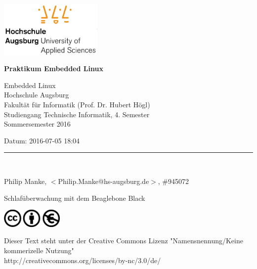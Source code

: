 \documentclass[a4paper,ngerman]{article}
\begin{document}
\ \ 
\hfill
\begin{minipage}[t]{5cm}
\includegraphics[width=5cm]{img/hsa-logo.jpg}
\end{minipage}

\vskip 10mm

{\parindent=0pt

\thispagestyle{empty}


{\Large\bf Praktikum Embedded Linux
}

\vskip 5mm

Embedded Linux \\
Hochschule Augsburg \\
Fakultät für Informatik (Prof. Dr. Hubert Högl) \\
Studiengang Technische Informatik, 4. Semester \\

Sommersemester 2016
 

Datum: 2016-07-05 18:04 \\

\medskip

\rule{10cm}{4pt}\\

\medskip

Philip Manke, $<$Philip.Manke@hs-augsburg.de$>$, \#945072 \\


\vskip 2cm

\begin{center}
{\LARGE\bf

Schlafüberwachung mit dem Beaglebone Black

}
\end{center}

\vfill

\begin{minipage}[t]{3cm}
\includegraphics[width=3cm]{img/cc-logo.jpg}
\end{minipage}

{\small
Dieser Text steht unter der Creative Commons Lizenz "Namensnennung/Keine kommerizelle Nutzung"\\
http://creativecommons.org/licenses/by-nc/3.0/de/
}

} %
\end{document}
